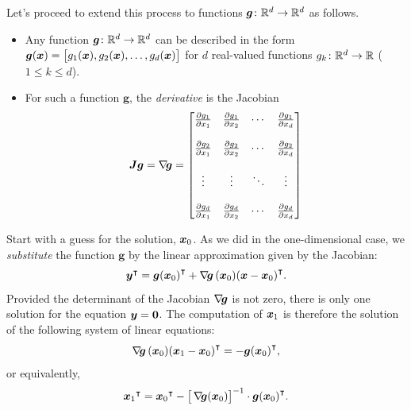 Let's proceed to extend this process to functions $\boldsymbol{g} \colon \mathbb{R}^d \to \mathbb{R}^d$ as follows.
\begin{itemize}
	\item Any function $\boldsymbol{g} \colon \mathbb{R}^d \to \mathbb{R}^d$ can be described in the form $\boldsymbol{g}(\boldsymbol{x}) = \big[ g_1(\boldsymbol{x}), g_2(\boldsymbol{x}), \dotsc, g_d(\boldsymbol{x}) \big]$ for $d$ real-valued functions $g_k\colon \mathbb{R}^d \to \mathbb{R}$ ($1\leq k \leq d$).
	\item For such a function $\boldsymbol{g}$, the \emph{derivative} is the Jacobian
	\begin{equation*}
	\boldsymbol{J} \boldsymbol{g} = \mathop{\nabla\! {\boldsymbol{g}}} = \begin{bmatrix}
	\frac{\partial g_1}{\partial x_1} & \frac{\partial g_1}{\partial x_2} & \dotsb & \frac{\partial g_1}{\partial x_d} \\ \\
	\frac{\partial g_2}{\partial x_1} & \frac{\partial g_2}{\partial x_2} & \dotsb & \frac{\partial g_2}{\partial x_d} \\ \\
	\vdots & \vdots & \ddots & \vdots \\ \\
	\frac{\partial g_d}{\partial x_1} & \frac{\partial g_d}{\partial x_2} & \dotsb & \frac{\partial g_d}{\partial x_d} \\
	\end{bmatrix}
	\end{equation*}
\end{itemize}
Start with a guess for the solution, $\boldsymbol{x}_0$.  As we did in the one-dimensional case, we \emph{substitute} the function $\boldsymbol{g}$ by the linear approximation given by the Jacobian:
\begin{equation*}
{\boldsymbol{y}}^\intercal = {\boldsymbol{g}(\boldsymbol{x}_0)}^\intercal+ \mathop{\nabla\! {\boldsymbol{g}}}{(\boldsymbol{x}_0)(\boldsymbol{x} - \boldsymbol{x}_0)}^\intercal.
\end{equation*}
Provided the determinant of the Jacobian $\mathop{\nabla\! {\boldsymbol{g}}}$ is not zero, there is only one solution for the equation $\boldsymbol{y} = \boldsymbol{0}$.
 The computation of $\boldsymbol{x}_1$ is therefore the solution of the following system of linear equations:
\begin{equation*}
\mathop{\nabla\! {\boldsymbol{g}}}{(\boldsymbol{x}_0)(\boldsymbol{x}_1-\boldsymbol{x}_0)}^\intercal = -{\boldsymbol{g}(\boldsymbol{x}_0)}^\intercal, 
\end{equation*}
or equivalently,
\begin{equation*}
{\boldsymbol{x}_1}^\intercal = {\boldsymbol{x}_0}^\intercal - \big[ \mathop{\nabla\! {\boldsymbol{g}}}(\boldsymbol{x}_0) \big]^{-1} \cdot {\boldsymbol{g}(\boldsymbol{x}_0)}^\intercal.
\end{equation*}
